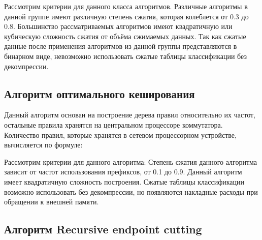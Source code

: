 \documentclass[a4peper, 12pt, titlepage, finall]{extreport}
\begin{document}
            Рассмотрим критерии для данного класса алгоритмов. Различные алгоритмы в данной группе имеют различную степень сжатия, 
            которая колеблется от 0.3 до 0.8. Большинство рассматриваемых алгоритмов имеют квадратичную или кубическую сложность сжатия 
            от объёма сжимаемых данных. Так как сжатые данные после применения алгоритмов из данной группы представляются в бинарном виде,
            невозможно использовать сжатые таблицы классификации без декомпрессии.
        \subsection{Алгоритм оптимального кеширования}
            Данный алгоритм основан на построение дерева правил относительно их частот, остальные правила хранятся на центральном процессоре коммутатора.
            Количество правил, которые хранятся в сетевом процессорном устройстве, вычисляется по формуле:

            Рассмотрим критерии для данного алгоритма: Степень сжатия данного алгоритма зависит от частот использования префиксов, от 0.1 до 0.9.
            Данный алгоритм имеет квадратичную сложность построения. Сжатые таблицы классификации возможно использовать без декомпрессии, 
            но появляются накладные расходы при обращении к внешней памяти. 
        \subsection{Алгоритм Recursive endpoint cutting}
            
    \begingroup
    \let\clearpage\relax
    \printbibliography
    \endgroup
\end{document}
